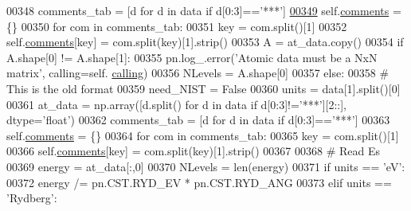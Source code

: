 \begin{DoxyCode}
{{00348             comments\_tab = [d \textcolor{keywordflow}{for} d \textcolor{keywordflow}{in} data \textcolor{keywordflow}{if} d[0:3]==\textcolor{stringliteral}{'***'}]
\hypertarget{pynebcore_8py_source_l00349}{}\hyperlink{classpyneb_1_1core_1_1pynebcore_1_1___atom_data_ascii_a935b1baf76c6450653d1ebb673bc8f08}{00349}             self.\hyperlink{classpyneb_1_1core_1_1pynebcore_1_1___atom_data_ascii_a935b1baf76c6450653d1ebb673bc8f08}{comments} = \{\}
00350             \textcolor{keywordflow}{for} com \textcolor{keywordflow}{in} comments\_tab:
00351                 key = com.split()[1]
00352                 self.\hyperlink{classpyneb_1_1core_1_1pynebcore_1_1___atom_data_ascii_a935b1baf76c6450653d1ebb673bc8f08}{comments}[key] = com.split(key)[1].strip()
00353             A = at\_data.copy()
00354             \textcolor{keywordflow}{if} A.shape[0] != A.shape[1]:
00355                 pn.log\_.error(\textcolor{stringliteral}{'Atomic data must be a NxN matrix'}, calling=self.
      \hyperlink{classpyneb_1_1core_1_1pynebcore_1_1___atom_data_ascii_af5c364ae799620ff1af6870cf78ae19b}{calling}) 
00356             NLevels = A.shape[0]
00357         \textcolor{keywordflow}{else}:
00358             \textcolor{comment}{# This is the old format}
00359             need\_NIST = \textcolor{keyword}{False}
00360             units = data[1].split()[0]
00361             at\_data = np.array([d.split() \textcolor{keywordflow}{for} d \textcolor{keywordflow}{in} data \textcolor{keywordflow}{if} d[0:3]!=\textcolor{stringliteral}{'***'}][2::], dtype=\textcolor{stringliteral}{'float'})
00362             comments\_tab = [d \textcolor{keywordflow}{for} d \textcolor{keywordflow}{in} data \textcolor{keywordflow}{if} d[0:3]==\textcolor{stringliteral}{'***'}]
00363             self.\hyperlink{classpyneb_1_1core_1_1pynebcore_1_1___atom_data_ascii_a935b1baf76c6450653d1ebb673bc8f08}{comments} = \{\}
00364             \textcolor{keywordflow}{for} com \textcolor{keywordflow}{in} comments\_tab:
00365                 key = com.split()[1]
00366                 self.\hyperlink{classpyneb_1_1core_1_1pynebcore_1_1___atom_data_ascii_a935b1baf76c6450653d1ebb673bc8f08}{comments}[key] = com.split(key)[1].strip()
00367             
00368             \textcolor{comment}{# Read Es}
00369             energy = at\_data[:,0]
00370             NLevels = len(energy)
00371             \textcolor{keywordflow}{if} units == \textcolor{stringliteral}{'eV'}: 
00372                 energy /= pn.CST.RYD\_EV * pn.CST.RYD\_ANG
00373             \textcolor{keywordflow}{elif} units == \textcolor{stringliteral}{'Rydberg'}:
}}
\end{DoxyCode}
